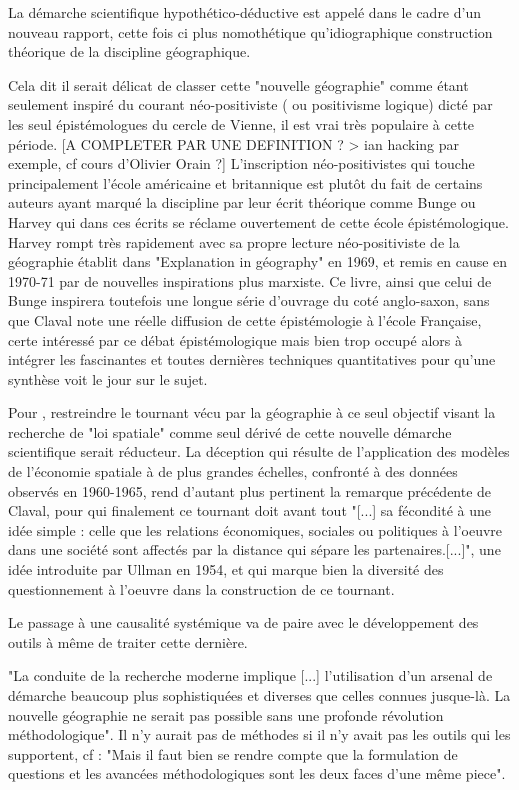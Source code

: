 La démarche scientifique hypothético-déductive est appelé dans le cadre d'un nouveau rapport, cette fois ci plus nomothétique qu'idiographique construction théorique de la discipline géographique.

Cela dit il serait délicat de classer cette "nouvelle géographie" comme étant seulement inspiré du courant néo-positiviste ( ou positivisme logique) dicté par les seul épistémologues du cercle de Vienne, il est vrai très populaire à cette période. [A COMPLETER PAR UNE DEFINITION ? > ian hacking par exemple, cf cours d'Olivier Orain ?] L'inscription néo-positivistes qui touche principalement l'école américaine et britannique est plutôt du fait de certains auteurs ayant marqué la discipline par leur écrit théorique comme Bunge ou Harvey qui dans ces écrits se réclame ouvertement de cette école épistémologique. Harvey rompt très rapidement avec sa propre lecture néo-positiviste de la géographie établit dans "Explanation in géography" en 1969, et remis en cause en 1970-71 par de nouvelles inspirations plus marxiste. Ce livre, ainsi que celui de Bunge inspirera toutefois une longue série d'ouvrage du coté anglo-saxon, sans que Claval note une réelle diffusion de cette épistémologie à l'école Française, certe intéressé par ce débat épistémologique mais bien trop occupé alors à intégrer les fascinantes et toutes dernières techniques quantitatives pour qu'une synthèse voit le jour sur le sujet.\autocite[27-29]{Claval2003}

Pour \autocite[162-165]{Claval2001}, restreindre le tournant vécu par la géographie à ce seul objectif visant la recherche de "loi spatiale" comme seul dérivé de cette nouvelle démarche scientifique serait réducteur. La déception qui résulte de l'application des modèles de l'économie spatiale à de plus grandes échelles, confronté à des données observés en 1960-1965, rend d'autant plus pertinent la remarque précédente de Claval, pour qui finalement ce tournant doit avant tout "[...] sa fécondité à une idée simple : celle que les relations économiques, sociales ou politiques à l'oeuvre dans une société sont affectés par la distance qui sépare les partenaires.[...]", une idée introduite par Ullman en 1954, et qui marque bien la diversité des questionnement à l'oeuvre dans la construction de ce tournant.


Le passage à une causalité systémique va de paire avec le développement des outils à même de traiter cette dernière. 

"La conduite de la recherche moderne implique [...] l'utilisation d'un arsenal de démarche beaucoup plus sophistiquées et diverses que celles connues jusque-là. La nouvelle géographie ne serait pas possible sans une profonde révolution méthodologique"\autocite[p27]{Claval1977}. Il n'y aurait pas de méthodes si il n'y avait pas les outils qui les supportent, cf \autocite{Gould1970} \autocite{Gould2004} : "Mais il faut bien se rendre compte que la formulation de questions et les avancées méthodologiques sont les deux faces d'une même piece".

